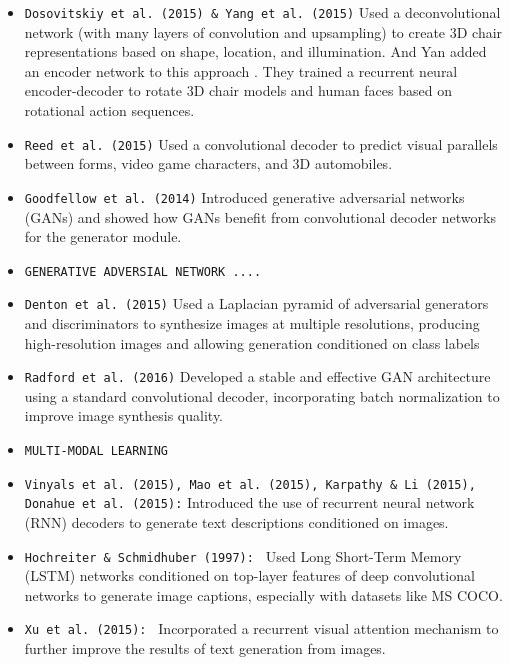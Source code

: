 \begin{itemize}[noitemsep]
    \item \texttt{Dosovitskiy et al. (2015) \& Yang et al. (2015)}
    Used a deconvolutional network (with many layers of convolution and upsampling) 
    to create 3D chair representations based on shape, location, and illumination.
    And Yan added an encoder network to this approach .
    They trained a recurrent neural encoder-decoder to rotate 3D chair models
    and human faces based on rotational action sequences.

    \item \texttt{Reed et al. (2015)}
    Used a convolutional decoder to predict visual parallels between forms, video game characters, and 3D automobiles.

    \item \texttt{Goodfellow et al. (2014)}
    Introduced generative adversarial networks (GANs) and showed how GANs benefit from convolutional decoder networks for the generator module.

    \item \texttt{GENERATIVE ADVERSIAL NETWORK ....}
    
    \item \texttt{Denton et al. (2015)}
    Used a Laplacian pyramid of adversarial generators and discriminators to synthesize images 
    at multiple resolutions, producing high-resolution images and allowing generation conditioned on class labels

    \item \texttt{Radford et al. (2016)}
    Developed a stable and effective GAN architecture using a standard convolutional decoder, 
    incorporating batch normalization to improve image synthesis quality.

    \item \texttt{MULTI-MODAL LEARNING  }


    \item \texttt{Vinyals et al. (2015), Mao et al. (2015), Karpathy \& Li (2015), Donahue et al. (2015):}
    Introduced the use of recurrent neural network (RNN) decoders to generate text descriptions conditioned on images.

    \item \texttt{Hochreiter \& Schmidhuber (1997): }
    Used Long Short-Term Memory (LSTM) networks conditioned on top-layer features of deep convolutional networks 
    to generate image captions, especially with datasets like MS COCO.

    \item \texttt{Xu et al. (2015): }
    Incorporated a recurrent visual attention mechanism to further improve the results of text generation from images.


\end{itemize}
